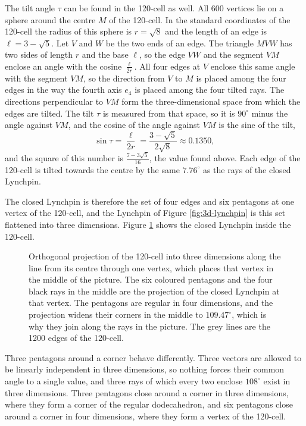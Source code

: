 \documentclass[a4paper,12pt]{article}
\begin{document}
The tilt angle \( \tau \) can be found in the 120-cell as well. All 600 vertices lie on a sphere around the centre \( M \) of the 120-cell. In the standard coordinates of the 120-cell \cite{coxeter} the radius of this sphere is \( r = \sqrt{8} \) and the length of an edge is \( \ell = 3 - \sqrt{5} \). Let \( V \) and \( W \) be the two ends of an edge. The triangle \( MVW \) has two sides of length \( r \) and the base \( \ell \), so the edge \( VW \) and the segment \( VM \) enclose an angle with the cosine \( \frac{\ell}{2r} \). All four edges at \( V \) enclose this same angle with the segment \( VM \), so the direction from \( V \) to \( M \) is placed among the four edges in the way the fourth axis \( e_4 \) is placed among the four tilted rays. The directions perpendicular to \( VM \) form the three-dimensional space from which the edges are tilted. The tilt \( \tau \) is measured from that space, so it is \( 90^\circ \) minus the angle against \( VM \), and the cosine of the angle against \( VM \) is the sine of the tilt,
\[
\sin\tau = \frac{\ell}{2r} = \frac{3 - \sqrt{5}}{2\sqrt{8}} \approx 0.1350 ,
\]
and the square of this number is \( \frac{7 - 3\sqrt{5}}{16} \), the value found above. Each edge of the 120-cell is tilted towards the centre by the same \( 7.76^\circ \) as the rays of the closed Lynchpin.

The closed Lynchpin is therefore the set of four edges and six pentagons at one vertex of the 120-cell, and the Lynchpin of Figure \ref{fig:3d-lynchpin} is this set flattened into three dimensions. Figure \ref{fig:cell120} shows the closed Lynchpin inside the 120-cell.

\begin{figure}[h]
\centering

\caption{Orthogonal projection of the 120-cell into three dimensions along the line from its centre through one vertex, which places that vertex in the middle of the picture. The six coloured pentagons and the four black rays in the middle are the projection of the closed Lynchpin at that vertex. The pentagons are regular in four dimensions, and the projection widens their corners in the middle to \( 109.47^\circ \), which is why they join along the rays in the picture. The grey lines are the 1200 edges of the 120-cell.}
\label{fig:cell120}
\end{figure}

Three pentagons around a corner behave differently. Three vectors are allowed to be linearly independent in three dimensions, so nothing forces their common angle to a single value, and three rays of which every two enclose \( 108^\circ \) exist in three dimensions. Three pentagons close around a corner in three dimensions, where they form a corner of the regular dodecahedron, and six pentagons close around a corner in four dimensions, where they form a vertex of the 120-cell.
\end{document}
